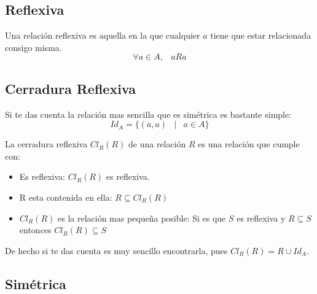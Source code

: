 \documentclass[12pt, fleqn]{report}                             %
\DeclareMathOperator \Space {\quad}                             %
\DeclareMathOperator \MiniSpace {\;}                            %
\newcommand \Such {\MiniSpace|\MiniSpace}                       %
\begin{document}
            \subsection{Reflexiva}

                Una relación reflexiva es aquella en la que cualquier $a$ tiene que estar relacionada
                consigo misma.
                \begin{equation}
                    \forall a \in A, \MiniSpace aRa
                \end{equation}


            \subsection*{Cerradura Reflexiva}

                Si te das cuenta la relación mas sencilla que es simétrica es bastante simple:
                \begin{equation}
                    Id_A = \{ (a, a) \Such a \in A \}
                \end{equation}


                La cerradura reflexiva $Cl_R(R)$ de una relación $R$ es una relación que cumple con:

                \begin{itemize}
                    \item Es reflexiva: $Cl_R(R)$ es reflexiva. 
                    \item R esta contenida en ella: $R \subseteq Cl_R(R)$
                    \item $Cl_R(R)$ es la relación mas pequeña posible: 
                    Si es que $S$ es reflexiva y $R \subseteq S$ entonces $Cl_R(R) \subseteq S$
                \end{itemize}



                De hecho si te das cuenta es muy sencillo encontrarla, pues
                $Cl_R(R) = R \cup Id_A$.




            \clearpage
            \subsection{Simétrica}
\end{document}
